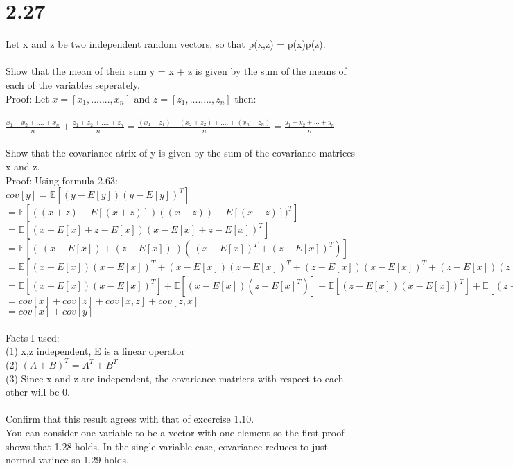 \documentclass[11pt,leqno,fleqn]{article}
\begin{document}
\section{2.27}
Let x and z be two independent random vectors, so that p(x,z) = p(x)p(z).\\
\\
Show that the mean of their sum y = x + z is given by the sum of the means of each of the variables seperately.\\
Proof: Let $x = [x_1,.......,x_n]$ and $z = [z_1,........,z_n]$ then: \\
\\
$\frac{x_1 + x_2+ .... + x_n}{n} + \frac{z_1 + z_2 + .... + z_n}{n} = \frac{(x_1+z_1) + (x_2 + z_2) + .... + (x_n + z_n)}{n} = \frac{y_1 + y_2 + ... + y_n}{n}$\\
\\ 
Show that the covariance atrix of y is given by the sum of the covariance matrices x and z.\\
Proof: Using formula 2.63:\\
$cov[y] = \mathbb{E}[(y - E[y])(y - E[y])^{T}]$\\
$=  \mathbb{E}[((x+z) - E[(x+ z)])((x+z)) - E[(x+z)])^{T}]$\\
$=\mathbb{E}[(x - E[x] + z - E[x])(x - E[x] + z - E[x])^{T}] $  
$=\mathbb{E}[( \ (x - E[x]) + (z - E[x]) \ )( \ (x - E[x])^{T} + (z - E[x])^{T})] $
$= \mathbb{E}[  (x - E[x])(x - E[x])^{T} + (x - E[x])(z - E[x])^{T} +  (z - E[x])(x - E[x])^{T}  +  (z - E[x]) (z - E[x])^{T}] $\\
$= \mathbb{E}[ (x - E[x])(x - E[x])^{T}] + \mathbb{E}[ (x - E[x])(z - E[x]^{T})] + \mathbb{E}[(z - E[x])(x - E[x])^{T}] + \mathbb{E}[(z - E[x]) (z - E[x])^{T})] $ \\
$= cov[x] + cov[z] + cov[x,z] + cov[z,x]$\\
$= cov[x] + cov[y]$ 
\\
\\
Facts I used:\\
 (1) x,z independent, E is a linear operator\\
 (2)  $(A + B)^{T} = A^{T} + B^{T}$\\
 (3) Since x and z are independent, the covariance matrices with respect to each other will be 0.\\
 \\
Confirm that this result agrees with that of excercise 1.10.\\
You can consider one variable to be a vector with one element so the first proof shows that 1.28 holds.
In the single variable case, covariance reduces to just normal varince so 1.29 holds.
\end{document}
